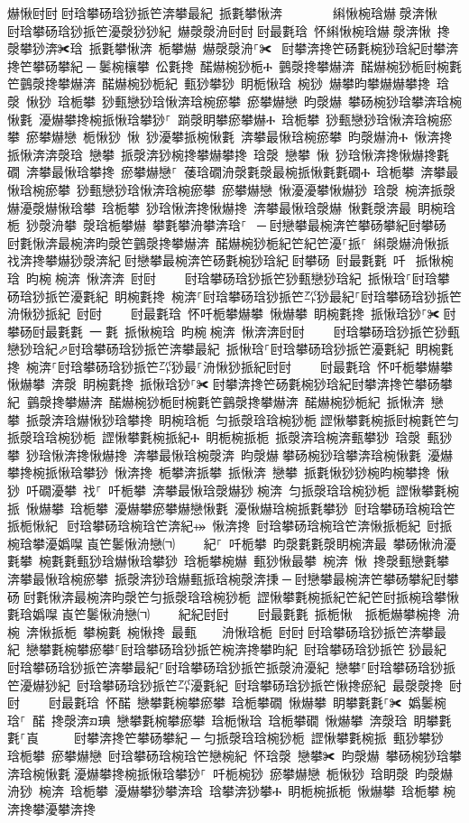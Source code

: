 ﻿\documentclass[output=paper]{langsci/langscibook}
\begin{document}
\begin{exe}
{\begin{exe}
爀愀尀尀਀尀琀攀砀琀猀挀笀渀攀最紀 挀氀攀愀渀        䌀愀椀琀爀漀渀愀  尀琀攀砀琀猀挀笀瀀漀猀猀紀 爀漀漀洀尀尀਀尀最氀琀 怀䌀愀椀琀爀漀渀愀 搀漀攀猀渀✀琀 挀氀攀愀渀 栀攀爀 爀漀漀洀⸀✀ ਀尀攀渀搀笀砀氀椀猀琀紀尀攀渀搀笀攀砀攀紀਀─਀䰀椀欀攀 伀氀搀 䤀爀椀猀栀Ⰰ 䴀漀搀攀爀渀 䤀爀椀猀栀尀椀氀笀䴀漀搀攀爀渀 䤀爀椀猀栀紀 甀猀攀猀 眀栀愀琀 椀猀 爀攀昀攀爀爀攀搀 琀漀 愀猀 琀栀攀 猀甀戀猀琀愀渀琀椀瘀攀 瘀攀爀戀 昀漀爀 攀砀椀猀琀攀渀琀椀愀氀 瀀爀攀搀椀挀愀琀攀猀⸀ 䠀漀眀攀瘀攀爀Ⰰ 琀栀攀 猀甀戀猀琀愀渀琀椀瘀攀 瘀攀爀戀 栀愀猀 愀 猀瀀攀挀椀愀氀 渀攀最愀琀椀瘀攀 昀漀爀洀Ⰰ 愀渀搀 挀愀渀渀漀琀 戀攀 挀漀渀猀椀搀攀爀攀搀 琀漀 戀攀 愀 猀琀愀渀搀愀爀搀氀礀 渀攀最愀琀攀搀 瘀攀爀戀⸀ 䔀琀礀洀漀氀漀最椀挀愀氀氀礀Ⰰ 琀栀攀 渀攀最愀琀椀瘀攀 猀甀戀猀琀愀渀琀椀瘀攀 瘀攀爀戀 愀瀀瀀攀愀爀猀 琀漀 椀渀挀漀爀瀀漀爀愀琀攀 琀栀攀 猀琀愀渀搀愀爀搀 渀攀最愀琀漀爀 愀氀漀渀最 眀椀琀栀 猀漀洀攀 漀琀栀攀爀 攀氀攀洀攀渀琀⸀ ਀─਀尀戀攀最椀渀笀攀砀攀紀尀攀砀਀尀氀愀渀最椀渀昀漀笀䴀漀搀攀爀渀 䤀爀椀猀栀紀笀紀笀瀀⸀挀⸀ 䌀漀爀洀愀挀 䄀渀搀攀爀猀漀渀紀਀尀戀攀最椀渀笀砀氀椀猀琀紀਀尀攀砀 尀最氀氀 吀 挀愀椀琀 昀椀椀渀 愀渀渀 尀尀਀    尀琀攀砀琀猀挀笀猀甀戀猀琀紀 挀愀琀⸀尀琀攀砀琀猀挀笀瀀氀紀 眀椀氀搀 椀渀⸀尀琀攀砀琀猀挀笀㌀猀最紀⸀尀琀攀砀琀猀挀笀洀愀猀挀紀 尀尀਀    尀最氀琀 怀吀栀攀爀攀 愀爀攀 眀椀氀搀 挀愀琀猀⸀✀਀尀攀砀尀最氀氀 一氀 挀愀椀琀 昀椀椀渀 愀渀渀尀尀਀    尀琀攀砀琀猀挀笀猀甀戀猀琀紀⬀尀琀攀砀琀猀挀笀渀攀最紀 挀愀琀⸀尀琀攀砀琀猀挀笀瀀氀紀 眀椀氀搀 椀渀⸀尀琀攀砀琀猀挀笀㌀猀最⸀洀愀猀挀紀尀尀਀    尀最氀琀 怀吀栀攀爀攀 愀爀攀 渀漀 眀椀氀搀 挀愀琀猀⸀✀਀尀攀渀搀笀砀氀椀猀琀紀尀攀渀搀笀攀砀攀紀਀਀䴀漀搀攀爀渀 䤀爀椀猀栀尀椀氀笀䴀漀搀攀爀渀 䤀爀椀猀栀紀 挀愀渀 戀攀 挀漀渀琀爀愀猀琀攀搀 眀椀琀栀 匀挀漀琀琀椀猀栀਀䜀愀攀氀椀挀尀椀氀笀匀挀漀琀琀椀猀栀 䜀愀攀氀椀挀紀Ⰰ 眀栀椀挀栀 挀漀渀琀椀渀甀攀猀 琀漀 甀猀攀 猀琀愀渀搀愀爀搀 渀攀最愀琀椀漀渀 昀漀爀਀攀砀椀猀琀攀渀琀椀愀氀 瀀爀攀搀椀挀愀琀攀猀 愀渀搀 栀攀渀挀攀 挀愀渀 戀攀 挀氀愀猀猀椀昀椀攀搀 愀猀 吀礀瀀攀 䄀⸀ 吀栀攀 渀攀最愀琀漀爀猀਀椀渀 匀挀漀琀琀椀猀栀 䜀愀攀氀椀挀 愀爀攀 琀栀攀 瀀爀攀瘀攀爀戀愀氀 瀀愀爀琀椀挀氀攀猀 尀琀攀砀琀椀琀笀挀栀愀紀⠀尀琀攀砀琀椀琀笀渀紀⤀ 愀渀搀 尀琀攀砀琀椀琀笀渀愀挀栀紀 尀挀椀琀攀瀀嬀㘀㄀崀笀䰀愀洀戀㈀　　㄀紀⸀ 吀栀攀 昀漀氀氀漀眀椀渀最 攀砀愀洀瀀氀攀 椀氀氀甀猀琀爀愀琀攀猀 琀栀攀椀爀 甀猀愀最攀 椀渀 愀 搀漀甀戀氀攀 渀攀最愀琀椀瘀攀 挀漀渀猀琀爀甀挀琀椀漀渀㨀਀─਀尀戀攀最椀渀笀攀砀攀紀尀攀砀਀尀氀愀渀最椀渀昀漀笀匀挀漀琀琀椀猀栀 䜀愀攀氀椀挀紀笀紀笀尀挀椀琀攀愀氀琀嬀㘀㄀崀笀䰀愀洀戀㈀　　㄀紀紀尀尀਀    尀最氀氀 挀栀愀  挀栀爀攀椀搀 洀椀 渀愀挀栀 攀椀氀 椀愀搀 最甀    洀愀琀栀 尀尀਀尀琀攀砀琀猀挀笀渀攀最紀 戀攀氀椀攀瘀攀⸀尀琀攀砀琀猀挀笀椀渀搀攀昀紀 尀琀攀砀琀猀挀笀㄀猀最紀 尀琀攀砀琀猀挀笀渀攀最紀⸀尀琀攀砀琀猀挀笀挀漀洀瀀紀 戀攀⸀尀琀攀砀琀猀挀笀瀀爀猀紀 尀琀攀砀琀猀挀笀㌀瀀氀紀 尀琀攀砀琀猀挀笀愀搀瘀紀 最漀漀搀 尀尀਀    尀最氀琀 怀䤀 戀攀氀椀攀瘀攀 琀栀攀礀 愀爀攀 眀攀氀氀⸀✀ 嬀䰀椀琀⸀ 䤀 搀漀渀ᤀ琠 戀攀氀椀攀瘀攀 琀栀愀琀 琀栀攀礀 愀爀攀 渀漀琀 眀攀氀氀⸀崀 ਀    尀攀渀搀笀攀砀攀紀਀─਀匀挀漀琀琀椀猀栀 䜀愀攀氀椀挀 甀猀攀猀 琀栀攀 瘀攀爀戀 尀琀攀砀琀椀琀笀戀椀紀 怀琀漀 戀攀✀ 昀漀爀 攀砀椀猀琀攀渀琀椀愀氀਀瀀爀攀搀椀挀愀琀攀猀⸀ 吀栀椀猀 瘀攀爀戀 栀愀猀 琀眀漀 昀漀爀洀猀 椀渀 琀栀攀 瀀爀攀猀攀渀琀 琀攀渀猀攀Ⰰ 眀栀椀挀栀 愀爀攀 琀栀攀਀椀渀搀攀瀀攀渀搀
\end{exe}}
\end{exe}
\end{document}

